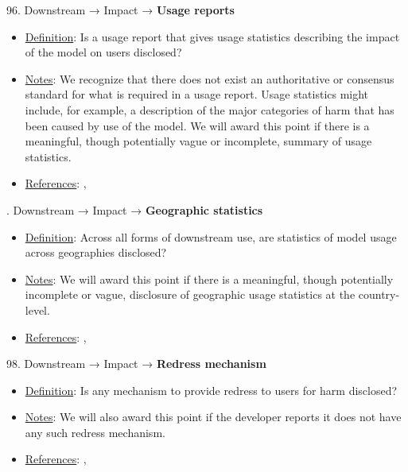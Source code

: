 96. Downstream → Impact → \textbf{Usage reports}
\vspace{-\parskip}
\begin{itemize}
\item
\underline{Definition}: Is a usage report that gives usage statistics describing the impact of the model on users disclosed?
\item
\underline{Notes}: We recognize that there does not exist an authoritative or consensus standard for what is required in a usage report. Usage statistics might include, for example, a description of the major categories of harm that has been caused by use of the model. We will award this point if there is a meaningful, though potentially vague or incomplete, summary of usage statistics.
\item
\underline{References}: \citet{brown2023allocating}, \citet{bommasani2023ecosystem}
\end{itemize} \vspace{\baselineskip}


. Downstream → Impact → \textbf{Geographic statistics}
\vspace{-\parskip}
\begin{itemize}
\item
\underline{Definition}: Across all forms of downstream use, are statistics of model usage across geographies disclosed?
\item
\underline{Notes}: We will award this point if there is a meaningful, though potentially incomplete or vague, disclosure of geographic usage statistics at the country-level.
\item
\underline{References}: \citet{brown2023allocating}, \citet{bommasani2023ecosystem}
\end{itemize} \vspace{\baselineskip}


98. Downstream → Impact → \textbf{Redress mechanism}
\vspace{-\parskip}
\begin{itemize}
\item
\underline{Definition}: Is any mechanism to provide redress to users for harm disclosed?
\item
\underline{Notes}: We will also award this point if the developer reports it does not have any such redress mechanism.
\item
\underline{References}: \citet{vipra2023}, \citet{bommasani2023ecosystem}
\end{itemize} \vspace{\baselineskip}


